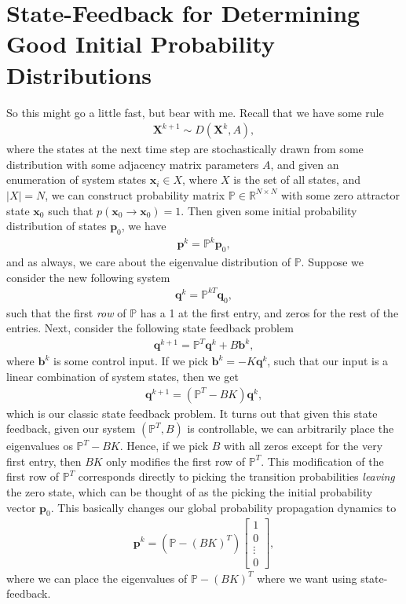 \documentclass[superscriptaddress]{revtex4-1}
\newcommand{\real}{\mathbb{R}}
\newcommand{\prob}{\mathbb{P}}
\begin{document}
\section{State-Feedback for Determining Good Initial Probability Distributions}
So this might go a little fast, but bear with me. Recall that we have some rule
\begin{align*}
\bm{X}^{k+1} \sim D(\bm{X}^k, A),
\end{align*}
where the states at the next time step are stochastically drawn from some distribution with some adjacency matrix parameters $A$, and given an enumeration of system states $\bm{x}_i \in X$, where $X$ is the set of all states, and $|X| = N$, we can construct probability matrix $\prob \in \real^{N \times N}$ with some zero attractor state $\bm{x}_0$ such that $p(\bm{x}_0 \rightarrow \bm{x}_0) = 1$. Then given some initial probability distribution of states $\bm{p}_0$, we have
\begin{align*}
\bm{p}^k = \prob^k \bm{p}_0,
\end{align*}
and as always, we care about the eigenvalue distribution of $\prob$. Suppose we consider the new following system
\begin{align*}
\bm{q}^k = \prob^{kT} \bm{q}_0,
\end{align*}
such that the first \emph{row} of $\prob$ has a 1 at the first entry, and zeros for the rest of the entries. Next, consider the following state feedback problem
\begin{align*}
\bm{q}^{k+1} = \prob^T \bm{q}^k + B\bm{b}^k,
\end{align*}
where $\bm{b}^k$ is some control input. If we pick $\bm{b}^k = -K\bm{q}^k$, such that our input is a linear combination of system states, then we get
\begin{align*}
\bm{q}^{k+1} = (\prob^T - BK)\bm{q}^k,
\end{align*}
which is our classic state feedback problem. It turns out that given this state feedback, given our system $(\prob^T, B)$ is controllable, we can arbitrarily place the eigenvalues os $\prob^T-BK$. Hence, if we pick $B$ with all zeros except for the very first entry, then $BK$ only modifies the first row of $\prob^T$. This modification of the first row of $\prob^T$ corresponds directly to picking the transition probabilities \emph{leaving} the zero state, which can be thought of as the picking the initial probability vector $\bm{p}_0$. This basically changes our global probability propagation dynamics to
\begin{align*}
\bm{p}^k = (\prob - (BK)^T)
\begin{bmatrix}
1\\0\\\vdots\\0
\end{bmatrix},
\end{align*}
where we can place the eigenvalues of $\prob - (BK)^T$ where we want using state-feedback.









	
\end{document}
